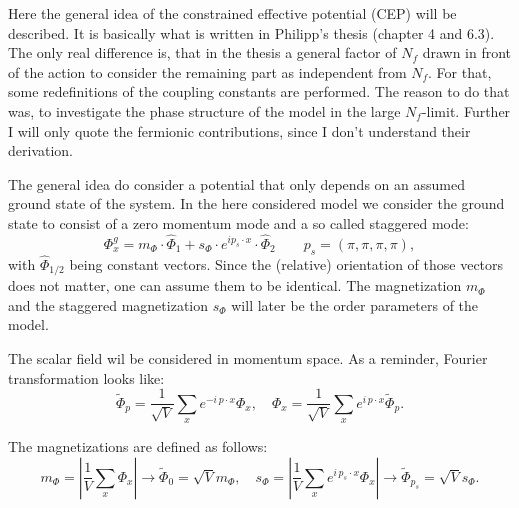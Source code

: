 Here the general idea of the constrained effective potential (CEP) will be described. It is basically what is written in 
Philipp's thesis (chapter 4 and 6.3). The only real difference is, that in the thesis a general factor of $N_f$ drawn in front of the action
to consider the remaining part as independent from $N_f$. For that, some redefinitions of the coupling constants are performed. The reason to do that was, to investigate the phase structure of the model in the large $N_f$-limit. Further I will only quote the fermionic contributions, since I don't understand their derivation.

The general idea do consider a potential that only depends on an assumed ground state of the system. 
In the here considered model we consider the ground state
to consist of a zero momentum mode and a so called staggered mode:
\begin{equation}\label{eq:def_groundstate}
 \Phi^g_x=m_{\Phi} \cdot \hat \Phi_1 + s_{\Phi} \cdot e^{i p_s \cdot x}\cdot \hat \Phi_2 \qquad p_s=(\pi,\pi,\pi,\pi),
\end{equation}
with $\hat \Phi_{1/2}$ being constant vectors. Since the (relative) orientation of those vectors does not matter, 
one can assume them to be identical. The magnetization $m_{\Phi}$ and the staggered magnetization $s_{\Phi}$ will later be the order
parameters of the model.

The scalar field wil be considered in momentum space. As a reminder, Fourier transformation looks like:
\begin{equation}\label{eq:def_FourierTrafoScalar}
 \tilde \Phi_p = \frac{1}{\sqrt{V}}\sum\limits_x e^{-i\, p \cdot x} \Phi_x,\quad \Phi_x= \frac{1}{\sqrt{V}}\sum\limits_x e^{i\, p \cdot x} \tilde \Phi_p.
\end{equation}

The magnetizations are defined as follows:
\begin{equation}\label{eq:def_magnetizations}
 m_{\Phi}=\left| \frac{1}{V} \sum\limits_x \Phi_x \right| \rightarrow \tilde\Phi_0 = \sqrt{V}m_{\Phi},\quad
 s_{\Phi}=\left| \frac{1}{V} \sum\limits_x e^{i\, p_s \cdot x}\Phi_x \right| \rightarrow \tilde\Phi_{p_s} = \sqrt{V}s_{\Phi}.
\end{equation}


